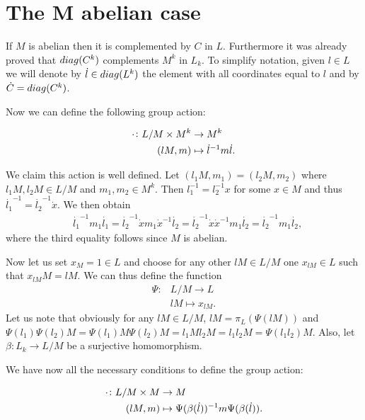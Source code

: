 \section{The M abelian case}

\newcommand{\dc}[0]{\dot{c}}

If $M$ is abelian then it is complemented by $C$ in $L$. Furthermore it was already proved that $diag({C^k})$ complements $M^k$ in $L_k$. To simplify notation, given $l \in L$ we will denote by $\dot{l} \in diag({L^k})$ the element with all coordinates equal to $l$ and by $\dot{C} = diag({C^k})$.

Now we can define the following group action:

\begin{align*}
    \cdot \colon L/M \times M^k &\rightarrow M^k \\
                (lM, m)  &\mapsto \dot{l}^{-1}m\dot{l}.
\end{align*}

We claim this action is well defined. Let $(l_1M, m_1) = (l_2M, m_2)$ where $l_1M, l_2M \in L/M$ and $m_1, m_2 \in M^k$.
Then $l_1^{-1} = l_2^{-1}x$ for some $x \in M$ and thus $\dot{l_1}^{-1} = \dot{l_2}^{-1}\dot{x}$. We then obtain 
\begin{align*}
    &\dot{l_1}^{-1}m_1\dot{l_1} = \dot{l_2}^{-1}\dot{x}m_1\dot{x}^{-1}\dot{l_2} = \dot{l_2}^{-1}\dot{x}\dot{x}^{-1}m_1\dot{l_2} = \dot{l_2}^{-1}m_1\dot{l_2},
\end{align*}
where the third equality follows since $M$ is abelian.

Now let us set $x_M = 1 \in L$ and choose for any other $lM \in L/M$ one $x_{lM} \in L$ such that $x_{lM}M = lM$. We can thus define the function
\begin{align*}
    \Psi \colon &L/M \rightarrow L \\
                &lM \mapsto x_{lM}.
\end{align*}
Let us note that obviously for any $lM \in L/M$, $lM = \pi_L(\Psi(lM))$ and $\Psi(l_1)\Psi(l_2)M = \Psi(l_1)M\Psi(l_2)M = l_1Ml_2M = l_1l_2M = \Psi(l_1l_2)M$. Also, let $\beta \colon L_k \rightarrow L/M$ be a surjective homomorphism.

We have now all the necessary conditions to define the group action:

\begin{align*}
    \cdot \colon L/M \times M &\rightarrow M \\
                (lM, m)  &\mapsto \Psi(\beta(\dot{l}))^{-1}m\Psi(\beta(\dot{l})).
\end{align*}

